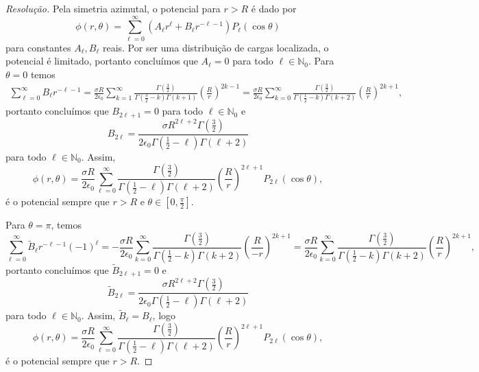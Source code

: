 \begin{proof}[Resolução]
    Pela simetria azimutal, o potencial para \(r > R\) é dado por
    \begin{equation*}
        \phi(r, \theta) = \sum_{\ell = 0}^\infty \left(A_\ell r^\ell + B_\ell r^{-\ell -1}\right)P_\ell(\cos\theta)
    \end{equation*}
    para constantes \(A_\ell, B_\ell\) reais. Por ser uma distribuição de cargas localizada, o potencial é limitado, portanto concluímos que \(A_\ell = 0\) para todo \(\ell \in \mathbb{N}_0\). Para \(\theta = 0\) temos
    \begin{align*}
        \sum_{\ell = 0}^\infty B_\ell r^{-\ell - 1}
        = \frac{\sigma R}{2 \epsilon_0} \sum_{k = 1}^\infty \frac{\Gamma\left(\frac32\right)}{\Gamma\left(\frac32 - k\right) \Gamma(k + 1)}\left(\frac{R}{r}\right)^{2k-1}
        = \frac{\sigma R}{2 \epsilon_0} \sum_{k = 0}^\infty \frac{\Gamma\left(\frac32\right)}{\Gamma\left(\frac12 - k\right) \Gamma(k + 2)}\left(\frac{R}{r}\right)^{2k+1},
    \end{align*}
    portanto concluímos que \(B_{2\ell + 1} = 0\) para todo \(\ell \in \mathbb{N}_0\) e
    \begin{equation*}
        B_{2\ell} = \frac{\sigma R^{2\ell + 2}\Gamma\left(\frac32\right)}{2 \epsilon_0 \Gamma(\frac12 - \ell) \Gamma(\ell+2)}
    \end{equation*}
    para todo \(\ell \in \mathbb{N}_0\). Assim,
    \begin{equation*}
        \phi(r, \theta) = \frac{\sigma R}{2 \epsilon_0}\sum_{\ell = 0}^\infty \frac{\Gamma\left(\frac32\right)}{\Gamma\left(\frac12 - \ell\right)\Gamma(\ell + 2)} \left(\frac{R}{r}\right)^{2\ell + 1} P_{2\ell}(\cos\theta),
    \end{equation*}
    é o potencial sempre que \(r > R\) e \(\theta \in [0, \frac{\pi}{2}]\).

    Para \(\theta = \pi\), temos
    \begin{equation*}
        \sum_{\ell=0}^\infty \tilde{B}_\ell r^{-\ell - 1} (-1)^\ell = -\frac{\sigma R}{2 \epsilon_0} \sum_{k = 0}^\infty \frac{\Gamma\left(\frac32\right)}{\Gamma\left(\frac12 - k\right) \Gamma\left(k+2\right)}\left(\frac{R}{-r}\right)^{2k + 1} = \frac{\sigma R}{2 \epsilon_0} \sum_{k = 0}^\infty \frac{\Gamma\left(\frac32\right)}{\Gamma\left(\frac12 - k\right) \Gamma\left(k+2\right)} \left(\frac{R}{r}\right)^{2k + 1},
    \end{equation*}
    portanto concluímos que \(\tilde{B}_{2\ell + 1} = 0\)  e
    \begin{equation*}
        \tilde{B}_{2\ell} = \frac{\sigma R^{2\ell + 2}\Gamma\left(\frac32\right)}{2 \epsilon_0 \Gamma \left(\frac12 - \ell\right) \Gamma(\ell + 2)}
    \end{equation*}
    para todo \(\ell \in \mathbb{N}_0\). Assim, \(\tilde{B}_{\ell} = B_{\ell}\), logo
    \begin{equation*}
        \phi(r, \theta) = \frac{\sigma R}{2 \epsilon_0}\sum_{\ell = 0}^\infty \frac{\Gamma\left(\frac32\right)}{\Gamma\left(\frac12 - \ell\right)\Gamma(\ell + 2)} \left(\frac{R}{r}\right)^{2\ell + 1} P_{2\ell}(\cos\theta),
    \end{equation*}
    é o potencial sempre que \(r > R\).
\end{proof}
